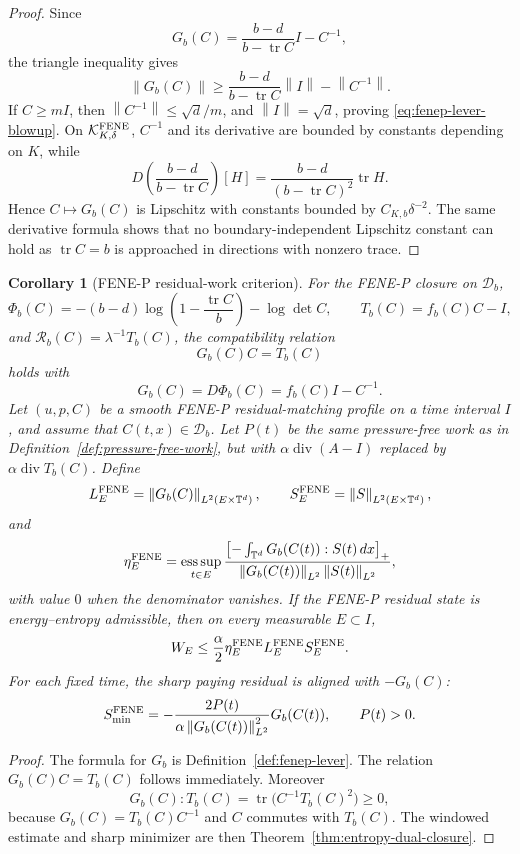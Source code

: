 \documentclass[11pt]{article}
\numberwithin{equation}{section}
\newtheorem{corollary}[theorem]{Corollary}
\newcommand{\T}{\mathbb T}
\newcommand{\Id}{I}
\newcommand{\tr}{\operatorname{tr}}
\newcommand{\divv}{\operatorname{div}}
\newcommand{\calD}{\mathcal D}
\newcommand{\calK}{\mathcal K}
\newcommand{\norm}[1]{\left\lVert #1\right\rVert}
\begin{document}
\begin{proof}
Since
\[
  G_b(C)=\frac{b-d}{b-\tr C}I-C^{-1},
\]
the triangle inequality gives
\[
  \norm{G_b(C)}
  \ge
  \frac{b-d}{b-\tr C}\norm{I}-\norm{C^{-1}} .
\]
If \(C\ge mI\), then \(\norm{C^{-1}}\le\sqrt d/m\), and
\(\norm{I}=\sqrt d\), proving \eqref{eq:fenep-lever-blowup}.  On
\(\calK_{K,\delta}^{\rm FENE}\), \(C^{-1}\) and its derivative are bounded by
constants depending on \(K\), while
\[
  D\left(\frac{b-d}{b-\tr C}\right)[H]
  =
  \frac{b-d}{(b-\tr C)^2}\tr H .
\]
Hence \(C\mapsto G_b(C)\) is Lipschitz with constants bounded by
\(C_{K,b}\delta^{-2}\).  The same derivative formula shows that no
boundary-independent Lipschitz constant can hold as \(\tr C=b\) is approached
in directions with nonzero trace.
\end{proof}

\begin{corollary}[FENE-P residual-work criterion]
\label{thm:fenep-residual}
For the FENE-P closure on \(\calD_b\),
\[
  \Phi_b(C)=
  - (b-d)\log\!\left(1-\frac{\tr C}{b}\right)-\log\det C,
  \qquad
  T_b(C)=f_b(C)C-\Id,
\]
and \(\mathcal R_b(C)=\lambda^{-1}T_b(C)\), the compatibility relation
\[
  G_b(C)C=T_b(C)
\]
holds with
\[
  G_b(C)=D\Phi_b(C)=f_b(C)\Id-C^{-1}.
\]
Let \((u,p,C)\) be a smooth FENE-P residual-matching profile on a time interval
\(I\), and assume that \(C(t,x)\in\calD_b\).  Let \(P(t)\) be the same
pressure-free work as in Definition~\ref{def:pressure-free-work}, but with
\(\alpha\divv(A-I)\) replaced by \(\alpha\divv T_b(C)\).  Define
\[
  L_E^{\rm FENE}=\norm{G_b(C)}_{L^2(E\times\T^d)},\qquad
  S_E^{\rm FENE}=\norm{S}_{L^2(E\times\T^d)},
\]
and
\[
  \eta_E^{\rm FENE}
  =
  \operatorname*{ess\,sup}_{t\in E}
  \frac{\left[-\int_{\T^d}G_b(C(t)):S(t)\,dx\right]_+}
       {\norm{G_b(C(t))}_{L^2}\norm{S(t)}_{L^2}},
\]
with value \(0\) when the denominator vanishes.  If the FENE-P residual state
is energy--entropy admissible, then on every measurable \(E\subset I\),
\[
  W_E\le
  \frac{\alpha}{2}
  \eta_E^{\rm FENE}L_E^{\rm FENE}S_E^{\rm FENE}.
  \label{eq:fenep-window}
\]
For each fixed time, the sharp paying residual is aligned with
\(-G_b(C)\):
\[
  S_{\min}^{\rm FENE}
  =
  -\frac{2P(t)}{\alpha\norm{G_b(C(t))}_{L^2}^2}G_b(C(t)),
  \qquad P(t)>0 .
\]
\end{corollary}

\begin{proof}
The formula for \(G_b\) is Definition~\ref{def:fenep-lever}.  The relation
\(G_b(C)C=T_b(C)\) follows immediately.  Moreover
\[
  G_b(C):T_b(C)=\tr\bigl(C^{-1}T_b(C)^2\bigr)\ge0,
\]
because \(G_b(C)=T_b(C)C^{-1}\) and \(C\) commutes with \(T_b(C)\).  The
windowed estimate and sharp minimizer are then Theorem~\ref{thm:entropy-dual-closure}.
\end{proof}
\end{document}
